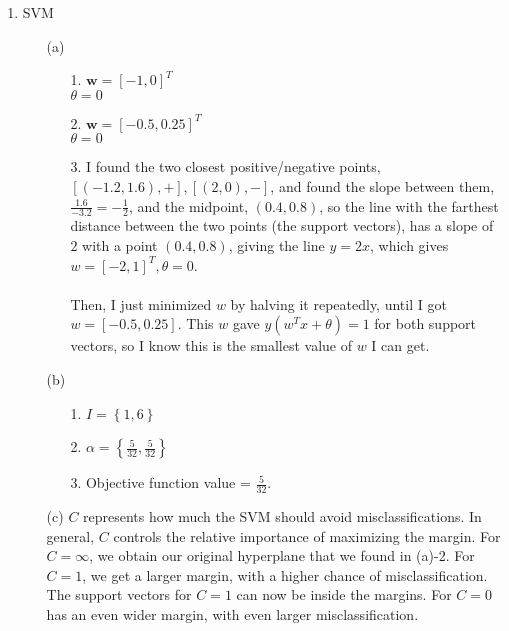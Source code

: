 
\usepackage{amssymb,amsmath}
\usepackage[]{units}
\oddsidemargin 0in
\evensidemargin 0in
\textwidth 6.5in
\topmargin -0.5in
\textheight 9.0in





\pagestyle{myheadings}  %

\begin{enumerate}
\item SVM
  \begin{enumerate}
  \item [(a)]
    \begin{enumerate}  
    \item [1.]
      $\textbf{w} = [-1,0]^T$\\
      $\theta = 0$
    \item [2.]
      $\textbf{w} = [-0.5,0.25]^T$\\
      $\theta = 0$
    \item [3.]
      I found the two closest positive/negative points, $[(-1.2,1.6), +], [(2,0), -]$, and found the slope between them, $\frac{1.6}{-3.2} = -\frac{1}{2}$, and the midpoint, $(0.4, 0.8)$, so the line with the farthest distance between the two points (the support vectors), has a slope of $2$ with a point $(0.4, 0.8)$, giving the line $y=2x$, which gives $w=[-2,1]^T, \theta=0$.\\\\
      Then, I just minimized $w$ by halving it repeatedly, until I got $w=[-0.5,0.25]$. This $w$ gave $y(w^Tx+\theta)=1$ for both support vectors, so I know this is the smallest value of $w$ I can get.      
    \end{enumerate}
  \item [(b)]
    \begin{enumerate}
    \item [1.]
      $I = \left\{1,6\right\}$
    \item [2.]
      $\alpha = \left\{\frac{5}{32},\frac{5}{32}\right\}$
    \item [3.]
      Objective function value = $\frac{5}{32}$.
    \end{enumerate}
  \item [(c)]
    $C$ represents how much the SVM should avoid misclassifications. In general, $C$ controls the relative importance of maximizing the margin. For $C=\infty$, we obtain our original hyperplane that we found in (a)-2. For $C=1$, we get a larger margin, with a higher chance of misclassification. The support vectors for $C=1$ can now be inside the margins. For $C=0$ has an even wider margin, with even larger misclassification.

\end{enumerate}
\end{enumerate}

